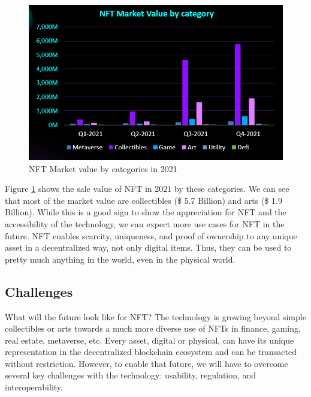 \documentclass[12pt, titlepage]{article}
\begin{document}
\begin{figure}[ht]
\label{fig:nftsale}
\includegraphics[width=14cm]{img/nftchart.png}
\centering
\caption{NFT Market value by categories in 2021 \cite{nftsale}}
\end{figure}

Figure \ref{fig:nftsale} shows the sale value of NFT in 2021 by these categories. We can see that most of the market value are collectibles (\$ 5.7 Billion) and arts (\$ 1.9 Billion). While this is a good sign to show the appreciation for NFT and the accessibility of the technology, we can expect more use cases for NFT in the future. NFT enables scarcity, uniqueness, and proof of ownership to any unique asset in a decentralized way, not only digital items. Thus, they can be used to pretty much anything in the world, even in the physical world. 

\subsection{Challenges}
What will the future look like for NFT? The technology is growing beyond simple collectibles or arts towards a much more diverse use of NFTs in finance, gaming, real estate, metaverse, etc. Every asset, digital or physical, can have its unique representation in the decentralized blockchain ecosystem and can be transacted without restriction. However, to enable that future, we will have to overcome several key challenges with the technology: usability, regulation, and interoperability.
\end{document}
